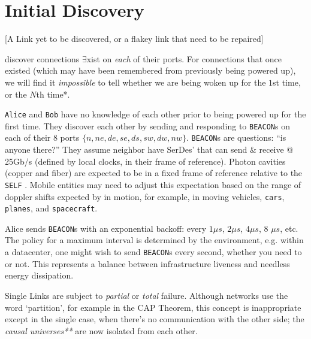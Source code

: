 \documentclass[../../../OAE-SPEC-MAIN.tex]{subfiles}
\begin{document}
\section{Initial Discovery}

[A Link yet to be discovered, or a flakey link that need to be repaired]

\CELLs discover connections $\exists$xist on \emph{each} of their ports. For connections that once existed (which may have been remembered from previously being powered up), we will find it \emph{impossible} to tell whether we are being woken up for the $1$st time, or the $N$th time*. 

\texttt{Alice} and \texttt{Bob} have no knowledge of each other prior to being powered up for the first time. They discover each other by sending and responding to \texttt{BEACON}s on each of their 8 ports $\{n,ne,de,se,ds,sw,dw,nw\}$. \texttt{BEACON}s are questions: ``is anyone there?'' They assume  neighbor \CELLs have SerDes' that can send \& receive @ 25Gb/s (defined by local clocks, in their frame of reference). Photon cavities (copper and fiber) are expected to be in a fixed frame of reference relative to the \texttt{SELF} \CELL.  Mobile entities may need to adjust this expectation based on the range of doppler shifts expected by \CELLs in motion, for example, in moving vehicles, \texttt{cars}, \texttt{planes}, and \texttt{spacecraft}.


Alice sends \texttt{BEACON}s with an exponential backoff: every $1\mu s$, $2 \mu s$, $4 \mu s$, 8 $\mu s$, etc. The  policy for a maximum interval  is determined by the environment, e.g. within a datacenter, one might wish to send  \texttt{BEACON}s every second, whether you need to or not.  This  represents a balance between infrastructure liveness and needless energy dissipation.


Single Links are subject to \emph{partial} or \emph{total} failure. Although networks use the word  `partition', for example in the CAP Theorem\cite{CAP}, this concept is inappropriate except in the single \LINK case, when there's no communication with the other side; the  \emph{causal %
 universes**} are now isolated from each other.
 
 
 
 
\end{document}
